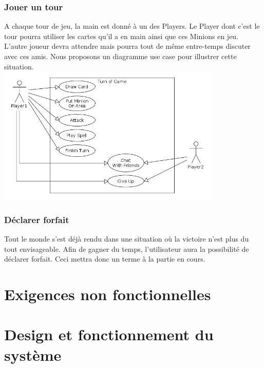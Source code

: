 \newpage
\subsubsection{Jouer un tour}
{\noindent A chaque tour de jeu, la main est donné à un des Players. Le Player dont c'est le tour pourra utiliser les cartes qu'il a en main ainsi que ces Minions en jeu. L'autre joueur devra attendre mais pourra tout de même entre-temps discuter avec ces amis. Nous proposons un diagramme use case pour illustrer cette situation.\\
\includegraphics[width=0.8\textwidth]{Images/UseCaseGame.jpg}
}
\subsubsection{Déclarer forfait}
{\noindent Tout le monde s'est déjà rendu dans une situation où la victoire n'est plus du tout envisageable. Afin de gagner du temps, l'utilisateur aura la possibilité de déclarer forfait. Ceci mettra donc un terme à la partie en cours.}

\section{Exigences non fonctionnelles}
\section{Design et fonctionnement du système}
